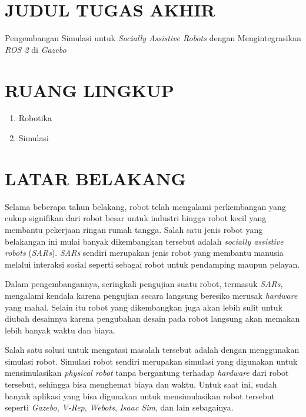 \section{JUDUL TUGAS AKHIR}

Pengembangan Simulasi untuk \emph{Socially Assistive Robots} dengan Mengintegrasikan \emph{ROS 2} di \emph{Gazebo}
\vspace{0.5ex}

\section{RUANG LINGKUP}

\begin{enumerate}[nolistsep]
  \item Robotika
  \item Simulasi
\end{enumerate}

\section{LATAR BELAKANG}

Selama beberapa tahun belakang, robot telah mengalami perkembangan yang cukup signifikan dari robot besar untuk industri hingga robot kecil yang membantu pekerjaan ringan rumah tangga.
Salah satu jenis robot yang belakangan ini mulai banyak dikembangkan tersebut adalah \emph{socially assistive robots} (\emph{SARs}).
\emph{SARs} sendiri merupakan jenis robot yang membantu manusia melalui interaksi sosial seperti sebagai robot untuk pendamping maupun pelayan.

Dalam pengembangannya, seringkali pengujian suatu robot, termasuk \emph{SARs}, mengalami kendala karena pengujian secara langsung beresiko merusak \emph{hardware} yang mahal.
Selain itu robot yang dikembangkan juga akan lebih sulit untuk diubah desainnya karena pengubahan desain pada robot langsung akan memakan lebih banyak waktu dan biaya.

Salah satu solusi untuk mengatasi masalah tersebut adalah dengan menggunakan simulasi robot.
Simulasi robot sendiri merupakan simulasi yang digunakan untuk mensimulasikan \emph{physical robot} tanpa bergantung terhadap \emph{hardware} dari robot tersebut, sehingga bisa menghemat biaya dan waktu.
Untuk saat ini, sudah banyak aplikasi yang bisa digunakan untuk mensimulasikan robot tersebut seperti \emph{Gazebo}, \emph{V-Rep}, \emph{Webots}, \emph{Isaac Sim}, dan lain sebagainya.

